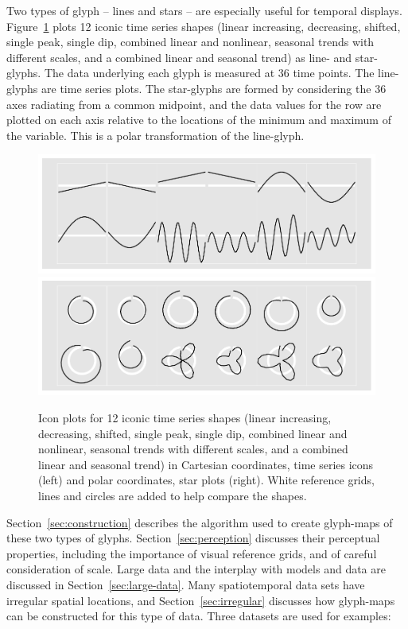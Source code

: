 \documentclass[oneside]{article}
\begin{document}
Two types of glyph -- lines and stars -- are especially useful for temporal displays. Figure~\ref{fig:templates} plots 12 iconic time series shapes (linear increasing, decreasing, shifted, single peak, single dip, combined linear and nonlinear, seasonal trends with different scales, and a combined linear and seasonal trend) as line- and star-glyphs. The data underlying each glyph is measured at 36 time points. The line-glyphs are   time series plots. The star-glyphs are formed by considering the 36 axes radiating from a common midpoint, and the data values for the row are plotted on each axis relative to the locations of the minimum and maximum of the variable. This is a polar transformation of the line-glyph.

\begin{figure}[htbp]
  \centering
  \includegraphics[width=0.5\linewidth]{euclid-to-polar-1}%
  \includegraphics[width=0.5\linewidth]{euclid-to-polar-2}

  \caption{Icon plots for 12 iconic time series shapes (linear increasing, decreasing, shifted, single peak, single dip, combined linear and nonlinear, seasonal trends with different scales, and a combined linear and seasonal trend) in Cartesian coordinates, time series icons (left) and polar coordinates, star plots (right). White reference grids, lines and circles are added to help compare the shapes.}
  \label{fig:templates}
\end{figure}

Section~\ref{sec:construction} describes the algorithm used to create glyph-maps of these two types of glyphs. Section~\ref{sec:perception} discusses their perceptual properties, including the importance of visual reference grids, and of careful consideration of scale. Large data and the interplay with models and data are discussed in Section~\ref{sec:large-data}. Many spatiotemporal data sets have irregular spatial locations, and Section~\ref{sec:irregular} discusses how glyph-maps can be constructed for this type of data. Three datasets are used for examples:
\end{document}
